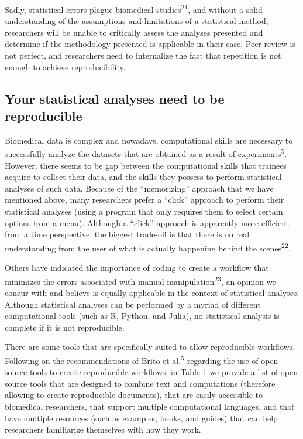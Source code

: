 \documentclass[smallextended]{svjour3}       %
\begin{document}
Sadly, statistical errors plague biomedical studies\textsuperscript{21},
and without a solid understanding of the assumptions and limitations of
a statistical method, researchers will be unable to critically assess
the analyses presented and determine if the methodology presented is
applicable in their case. Peer review is not perfect, and researchers
need to internalize the fact that repetition is not enough to achieve
reproducibility.

\hypertarget{your-statistical-analyses-need-to-be-reproducible}{%
\subsection{Your statistical analyses need to be
reproducible}\label{your-statistical-analyses-need-to-be-reproducible}}

Biomedical data is complex and nowadays, computational skills are
necessary to successfully analyze the datasets that are obtained as a
result of experiments\textsuperscript{5}. However, there seems to be gap
between the computational skills that trainees acquire to collect their
data, and the skills they possess to perform statistical analyses of
such data. Because of the ``memorizing'' approach that we have mentioned
above, many researchers prefer a ``click'' approach to perform their
statistical analyses (using a program that only requires them to select
certain options from a menu). Although a ``click'' approach is
apparently more efficient from a time perspective, the biggest trade-off
is that there is no real understanding from the user of what is actually
happening behind the scenes\textsuperscript{22}.

Others have indicated the importance of coding to create a workflow that
minimizes the errors associated with manual
manipulation\textsuperscript{23}, an opinion we concur with and believe
is equally applicable in the context of statistical analyses. Although
statistical analyses can be performed by a myriad of different
computational tools (such as R, Python, and Julia), no statistical
analysis is complete if it is not reproducible.

There are some tools that are specifically suited to allow reproducible
workflows. Following on the recommendations of Brito et
al.\textsuperscript{5} regarding the use of open source tools to create
reproducible workflows, in Table 1 we provide a list of open source
tools that are designed to combine text and computations (therefore
allowing to create reproducible documents), that are easily accessible
to biomedical researchers, that support multiple computational
languages, and that have multiple resources (such as examples, books,
and guides) that can help researchers familiarize themselves with how
they work.
\end{document}
